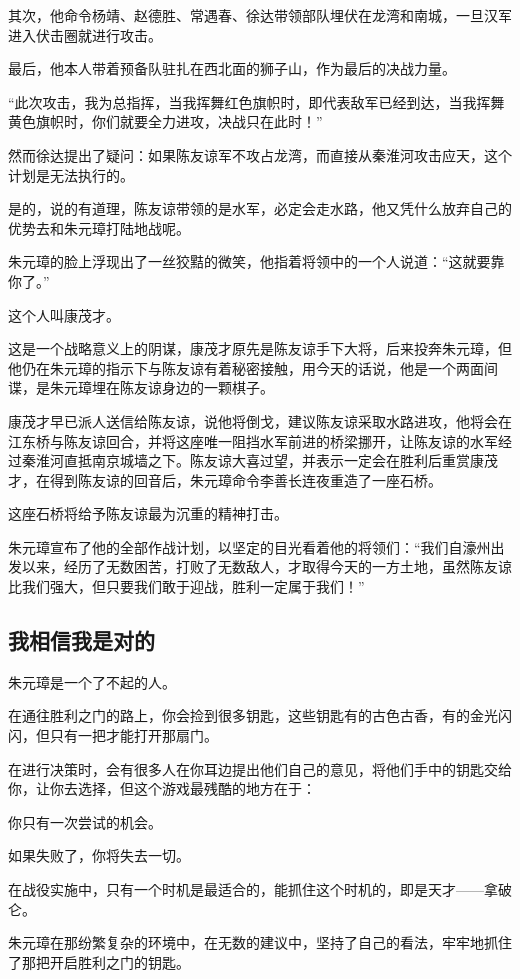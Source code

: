 \begin{multicols}{\theparacolNo}
		其次，他命令杨靖、赵德胜、常遇春、徐达带领部队埋伏在龙湾和南城，一旦汉军进入伏击圈就进行攻击。

		最后，他本人带着预备队驻扎在西北面的狮子山，作为最后的决战力量。

		“此次攻击，我为总指挥，当我挥舞红色旗帜时，即代表敌军已经到达，当我挥舞黄色旗帜时，你们就要全力进攻，决战只在此时！”

		然而徐达提出了疑问：如果陈友谅军不攻占龙湾，而直接从秦淮河攻击应天，这个计划是无法执行的。

		是的，说的有道理，陈友谅带领的是水军，必定会走水路，他又凭什么放弃自己的优势去和朱元璋打陆地战呢。

		朱元璋的脸上浮现出了一丝狡黠的微笑，他指着将领中的一个人说道：“这就要靠你了。”

		这个人叫康茂才。

		这是一个战略意义上的阴谋，康茂才原先是陈友谅手下大将，后来投奔朱元璋，但他仍在朱元璋的指示下与陈友谅有着秘密接触，用今天的话说，他是一个两面间谍，是朱元璋埋在陈友谅身边的一颗棋子。

		康茂才早已派人送信给陈友谅，说他将倒戈，建议陈友谅采取水路进攻，他将会在江东桥与陈友谅回合，并将这座唯一阻挡水军前进的桥梁挪开，让陈友谅的水军经过秦淮河直抵南京城墙之下。陈友谅大喜过望，并表示一定会在胜利后重赏康茂才，在得到陈友谅的回音后，朱元璋命令李善长连夜重造了一座石桥。

		这座石桥将给予陈友谅最为沉重的精神打击。

		朱元璋宣布了他的全部作战计划，以坚定的目光看着他的将领们：“我们自濠州出发以来，经历了无数困苦，打败了无数敌人，才取得今天的一方土地，虽然陈友谅比我们强大，但只要我们敢于迎战，胜利一定属于我们！”

		\subsection{我相信我是对的}
		朱元璋是一个了不起的人。

		在通往胜利之门的路上，你会捡到很多钥匙，这些钥匙有的古色古香，有的金光闪闪，但只有一把才能打开那扇门。

		在进行决策时，会有很多人在你耳边提出他们自己的意见，将他们手中的钥匙交给你，让你去选择，但这个游戏最残酷的地方在于：

		你只有一次尝试的机会。

		如果失败了，你将失去一切。

		在战役实施中，只有一个时机是最适合的，能抓住这个时机的，即是天才——拿破仑。

		朱元璋在那纷繁复杂的环境中，在无数的建议中，坚持了自己的看法，牢牢地抓住了那把开启胜利之门的钥匙。


\end{multicols}
